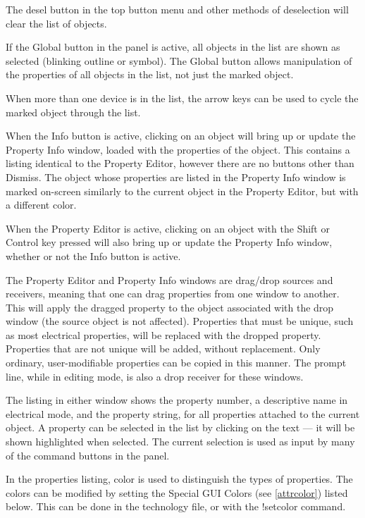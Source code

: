 The {\cb desel} button in the top button menu and other methods of
deselection will clear the list of objects.

If the {\cb Global} button in the panel is active, all objects in the
list are shown as selected (blinking outline or symbol).  The {\cb
Global} button allows manipulation of the properties of all objects in
the list, not just the marked object.

When more than one device is in the list, the arrow keys can be used
to cycle the marked object through the list.

When the {\cb Info} button is active, clicking on an object will bring
up or update the {\cb Property Info} window, loaded with the
properties of the object.  This contains a listing identical to the
{\cb Property Editor}, however there are no buttons other than {\cb
Dismiss}.  The object whose properties are listed in the {\cb Property
Info} window is marked on-screen similarly to the current object in
the {\cb Property Editor}, but with a different color.

When the {\cb Property Editor} is active, clicking on an object with
the {\kb Shift} or {\kb Control} key pressed will also bring up or
update the {\cb Property Info} window, whether or not the {\cb Info}
button is active.

The {\cb Property Editor} and {\cb Property Info} windows are
drag/drop sources and receivers, meaning that one can drag properties
from one window to another.  This will apply the dragged property to
the object associated with the drop window (the source object is not
affected).  Properties that must be unique, such as most electrical
properties, will be replaced with the dropped property.  Properties
that are not unique will be added, without replacement.  Only
ordinary, user-modifiable properties can be copied in this manner. 
The prompt line, while in editing mode, is also a drop receiver for
these windows.

The listing in either window shows the property number, a descriptive
name in electrical mode, and the property string, for all properties
attached to the current object.  A property can be selected in the
list by clicking on the text --- it will be shown highlighted when
selected.  The current selection is used as input by many of the
command buttons in the panel.

In the properties listing, color is used to distinguish the types of
properties.  The colors can be modified by setting the Special GUI
Colors (see \ref{attrcolor}) listed below.  This can be done in the
technology file, or with the {\cb !setcolor} command.

